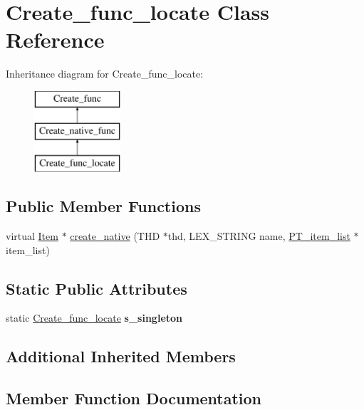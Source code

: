 \hypertarget{classCreate__func__locate}{}\section{Create\+\_\+func\+\_\+locate Class Reference}
\label{classCreate__func__locate}
Inheritance diagram for Create\+\_\+func\+\_\+locate\+:\begin{figure}[H]
\begin{center}
\leavevmode
\includegraphics[height=3.000000cm]{classCreate__func__locate}
\end{center}
\end{figure}
\subsection*{Public Member Functions}
\begin{DoxyCompactItemize}
\item 
virtual \mbox{\hyperlink{classItem}{Item}} $\ast$ \mbox{\hyperlink{classCreate__func__locate_a70e25481c64f950226c09d8b5e341570}{create\+\_\+native}} (T\+HD $\ast$thd, L\+E\+X\+\_\+\+S\+T\+R\+I\+NG name, \mbox{\hyperlink{classPT__item__list}{P\+T\+\_\+item\+\_\+list}} $\ast$item\+\_\+list)
\end{DoxyCompactItemize}
\subsection*{Static Public Attributes}
\begin{DoxyCompactItemize}
\item 
\mbox{\label{classCreate__func__locate_a49187d85149bb657c4ad36e306f7f412}} 
static \mbox{\hyperlink{classCreate__func__locate}{Create\+\_\+func\+\_\+locate}} {\bfseries s\+\_\+singleton}
\end{DoxyCompactItemize}
\subsection*{Additional Inherited Members}


\subsection{Member Function Documentation}
\mbox{\label{classCreate__func__locate_a70e25481c64f950226c09d8b5e341570}} 
